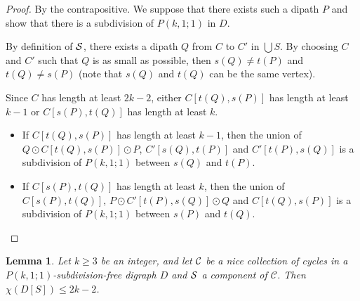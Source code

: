 \documentclass[utf8,10pt]{article}
\theoremstyle{plain}
\newtheorem{lemma}[theorem]{Lemma}
\theoremstyle{definition}
\theoremstyle{remark}
\begin{document}
\begin{proof}
By the contrapositive. We suppose that there exists such a dipath $P$ and show that there is a subdivision of $P(k,1;1)$ in $D$.

By definition of ${\cal S}$, there exists a dipath $Q$ from $C$ to $C'$ in $\bigcup S$. By choosing $C$ and $C'$ such that 
$Q$ is as small as possible, then $s(Q) \not = t(P)$ and $t(Q) \not = s(P)$ (note that $s(Q)$ and $t(Q)$ can be the same vertex). 

Since $C$ has length at least $2k-2$, either $C[t(Q), s(P)]$ has length at least $k-1$ or $C[s(P), t(Q)]$ has length at least $k$. 

\begin{itemize}
	\item If $C[t(Q), s(P)]$ has length at least $k-1$, then the union of $Q \odot C[t(Q), s(P)] \odot P$, $C'[s(Q), t(P)]$ and $C'[ t(P), s(Q)]$
	is a subdivision of $P(k,1;1)$ between $s(Q)$ and $t(P)$. 
	\item If $C[s(P), t(Q)]$ has length at least $k$, then the union of $C[s(P), t(Q)]$, $P \odot C'[t(P), s(Q)] \odot Q$ and $C[t(Q), s(P)]$
	is a subdivision of $P(k,1;1)$ between $s(P)$ and $t(Q)$. 
\end{itemize}
\end{proof}


\begin{lemma}\label{lem:compo1}
Let $k\geq 3$ be an integer, and let ${\cal C}$ be a nice collection of cycles in a $P(k,1;1)$-subdivision-free digraph $D$ and ${\cal S}$ a component of $\mathcal{C}$. Then $\chi(D[S]) \leq 2k-2$.	 
\end{lemma}
\end{document}
